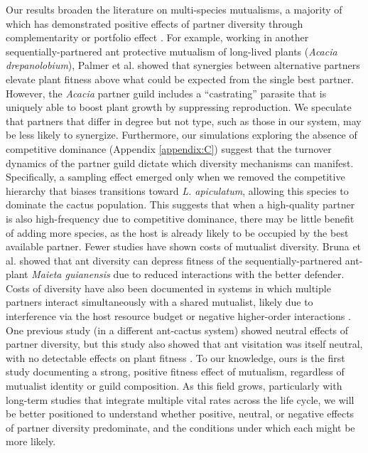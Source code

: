\documentclass[11pt]{article}
\begin{document}
Our results broaden the literature on multi-species mutualisms, a majority of which has demonstrated positive effects of partner diversity through complementarity \citep{Yang2024,Hernandez2020,Larimer2014,Afkhami2016,Fehling2022,Gustafson2005,McKeon2012,Palmer2010,Afkhami2021,Stachowicz2005} or portfolio effect \citep{Stevens2024,Thibaut2012,rogers2014,Lazaro2022}. 
For example, working in another sequentially-partnered ant protective mutualism of long-lived plants (\textit{Acacia drepanolobium}), Palmer et al. \citeyear{Palmer2010} showed that synergies between alternative partners elevate plant fitness above what could be expected from the single best partner. 
However, the \textit{Acacia} partner guild includes a ``castrating'' parasite that is uniquely able to boost plant growth by suppressing reproduction. 
We speculate that partners that differ in degree but not type, such as those in our system, may be less likely to synergize. 
Furthermore, our simulations exploring the absence of competitive dominance (Appendix \ref{appendix:C}) suggest that the turnover dynamics of the partner guild dictate which diversity mechanisms can manifest. 
Specifically, a sampling effect emerged only when we removed the competitive hierarchy that biases transitions toward \textit{L. apiculatum}, allowing this species to dominate the cactus population. 
This suggests that when a high-quality partner is also high-frequency due to competitive dominance, there may be little benefit of adding more species, as the host is already likely to be occupied by the best available partner.
Fewer studies have shown costs of mutualist diversity. 
Bruna et al. \citeyear{Bruna2014} showed that ant diversity can depress fitness of the sequentially-partnered ant-plant \textit{Maieta guianensis} due to reduced interactions with the better defender. 
Costs of diversity have also been documented in systems in which multiple partners interact simultaneously with a shared mutualist, likely due to interference via the host resource budget \citep{Keller2018} or negative higher-order interactions \citep{Barrett2015}. 
One previous study (in a different ant-cactus system) showed neutral effects of partner diversity, but this study also showed that ant visitation was itself neutral, with no detectable effects on plant fitness \citep{Ford2015}. 
To our knowledge, ours is the first study documenting a strong, positive fitness effect of mutualism, regardless of mutualist identity or guild composition. 
As this field grows, particularly with long-term studies that integrate multiple vital rates across the life cycle, we will be better positioned to understand whether positive, neutral, or negative effects of partner diversity predominate, and the conditions under which each might be more likely. 
\end{document}
